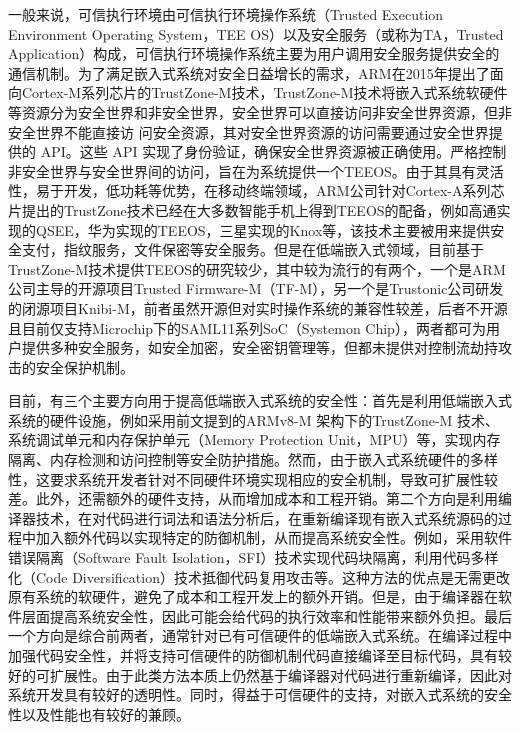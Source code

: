 \documentclass[12pt,a4paper]{ctexart}
\numberwithin{figure}{section}
\begin{document}
\par 一般来说，可信执行环境由可信执行环境操作系统（Trusted Execution Environment Operating System，TEE OS）以及安全服务（或称为TA，Trusted Application）构成，可信执行环境操作系统主要为用户调用安全服务提供安全的通信机制。为了满足嵌入式系统对安全日益增长的需求，ARM在2015年提出了面向Cortex-M系列芯片的TrustZone-M技术，TrustZone-M技术将嵌入式系统软硬件等资源分为安全世界和非安全世界，安全世界可以直接访问非安全世界资源，但非安全世界不能直接访 问安全资源，其对安全世界资源的访问需要通过安全世界提供的 API。这些 API 实现了身份验证，确保安全世界资源被正确使用。严格控制非安全世界与安全世界间的访问，旨在为系统提供一个TEEOS。由于其具有灵活性，易于开发，低功耗等优势，在移动终端领域，ARM公司针对Cortex-A系列芯片提出的TrustZone技术已经在大多数智能手机上得到TEEOS的配备，例如高通实现的QSEE，华为实现的TEEOS，三星实现的Knox等，该技术主要被用来提供安全支付，指纹服务，文件保密等安全服务。但是在低端嵌入式领域，目前基于TrustZone-M技术提供TEEOS的研究较少，其中较为流行的有两个，一个是ARM公司主导的开源项目Trusted Firmware-M（TF-M），另一个是Trustonic公司研发的闭源项目Knibi-M，前者虽然开源但对实时操作系统的兼容性较差，后者不开源且目前仅支持Microchip下的SAML11系列SoC（Systemon Chip），两者都可为用户提供多种安全服务，如安全加密，安全密钥管理等，但都未提供对控制流劫持攻击的安全保护机制。
\par 目前，有三个主要方向用于提高低端嵌入式系统的安全性：首先是利用低端嵌入式系统的硬件设施，例如采用前文提到的ARMv8-M 架构下的TrustZone-M 技术、系统调试单元和内存保护单元（Memory Protection Unit，MPU）等，实现内存隔离、内存检测和访问控制等安全防护措施。然而，由于嵌入式系统硬件的多样性，这要求系统开发者针对不同硬件环境实现相应的安全机制，导致可扩展性较差。此外，还需额外的硬件支持，从而增加成本和工程开销。第二个方向是利用编译器技术，在对代码进行词法和语法分析后，在重新编译现有嵌入式系统源码的过程中加入额外代码以实现特定的防御机制，从而提高系统安全性。例如，采用软件错误隔离（Software Fault Isolation，SFI）技术实现代码块隔离，利用代码多样化（Code Diversification）技术抵御代码复用攻击等。这种方法的优点是无需更改原有系统的软硬件，避免了成本和工程开发上的额外开销。但是，由于编译器在软件层面提高系统安全性，因此可能会给代码的执行效率和性能带来额外负担。最后一个方向是综合前两者，通常针对已有可信硬件的低端嵌入式系统。在编译过程中加强代码安全性，并将支持可信硬件的防御机制代码直接编译至目标代码，具有较好的可扩展性。由于此类方法本质上仍然基于编译器对代码进行重新编译，因此对系统开发具有较好的透明性。同时，得益于可信硬件的支持，对嵌入式系统的安全性以及性能也有较好的兼顾。
\end{document}
